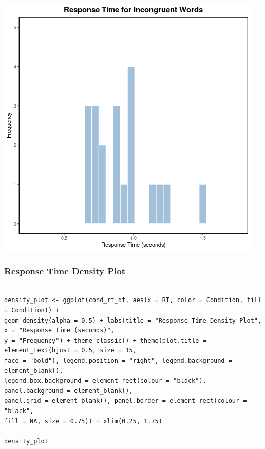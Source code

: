 \documentclass{article}
\begin{document}
\begin{center}
\includegraphics[width=.9\linewidth]{converted_stroop6.png}
\end{center}

\subsubsection{Response Time Density Plot}
\label{sec:orgfb08943}
\begin{verbatim}

density_plot <- ggplot(cond_rt_df, aes(x = RT, color = Condition, fill = Condition)) + 
geom_density(alpha = 0.5) + labs(title = "Response Time Density Plot", x = "Response Time (seconds)", 
y = "Frequency") + theme_classic() + theme(plot.title = element_text(hjust = 0.5, size = 15, 
face = "bold"), legend.position = "right", legend.background = element_blank(), 
legend.box.background = element_rect(colour = "black"), panel.background = element_blank(), 
panel.grid = element_blank(), panel.border = element_rect(colour = "black", 
fill = NA, size = 0.75)) + xlim(0.25, 1.75) 

density_plot

\end{verbatim}
\end{document}
